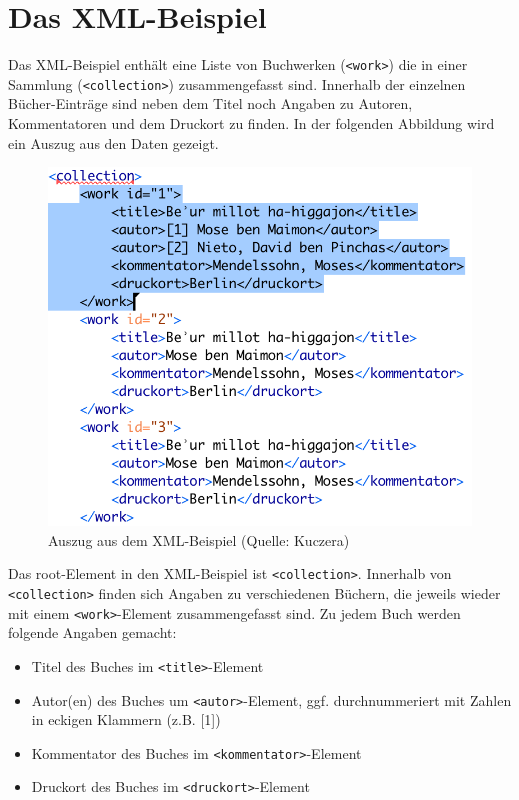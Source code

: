 \documentclass[ngerman,]{scrreprt}
\providecommand{\tightlist}{%
  \setlength{\itemsep}{0pt}\setlength{\parskip}{0pt}}
\begin{document}
\section{Das XML-Beispiel}\label{das-xml-beispiel}

Das XML-Beispiel enthält eine Liste von Buchwerken (\texttt{\textless{}work\textgreater{}}) die in einer Sammlung (\texttt{\textless{}collection\textgreater{}}) zusammengefasst sind. Innerhalb der einzelnen Bücher-Einträge sind neben dem Titel noch Angaben zu Autoren, Kommentatoren und dem Druckort zu finden. In der folgenden Abbildung wird ein Auszug aus den Daten gezeigt.

\begin{figure}
\centering
\includegraphics{./Bilder/kollatz-xml-Beispiel.png}
\caption{Auszug aus dem XML-Beispiel (Quelle: Kuczera)}
\end{figure}

Das root-Element in den XML-Beispiel ist \texttt{\textless{}collection\textgreater{}}. Innerhalb von \texttt{\textless{}collection\textgreater{}} finden sich Angaben zu verschiedenen Büchern, die jeweils wieder mit einem \texttt{\textless{}work\textgreater{}}-Element zusammengefasst sind. Zu jedem Buch werden folgende Angaben gemacht:

\begin{itemize}
\tightlist
\item
  Titel des Buches im \texttt{\textless{}title\textgreater{}}-Element
\item
  Autor(en) des Buches um \texttt{\textless{}autor\textgreater{}}-Element, ggf. durchnummeriert mit Zahlen in eckigen Klammern (z.B. {[}1{]})
\item
  Kommentator des Buches im \texttt{\textless{}kommentator\textgreater{}}-Element
\item
  Druckort des Buches im \texttt{\textless{}druckort\textgreater{}}-Element
\end{itemize}
\end{document}
